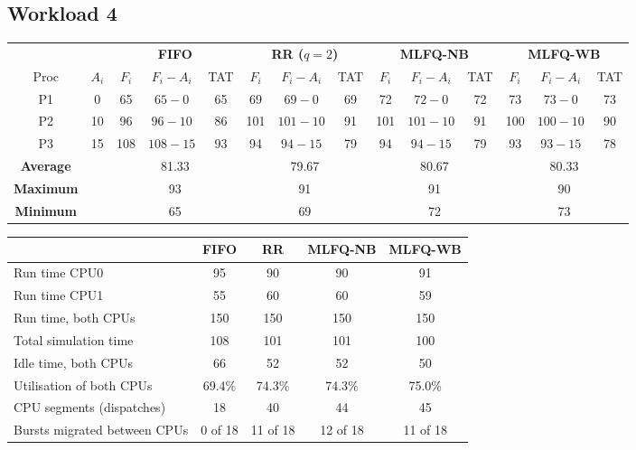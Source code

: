 \documentclass[11pt,a4paper]{article}
\begin{document}
\subsection{Workload 4}
\begin{center}\footnotesize\setlength{\tabcolsep}{4pt}
\begin{tabular}{cccccccccccccc}\toprule
& & \multicolumn{3}{c}{\textbf{FIFO}} & \multicolumn{3}{c}{\textbf{RR ($q=2$)}} & \multicolumn{3}{c}{\textbf{MLFQ-NB}} & \multicolumn{3}{c}{\textbf{MLFQ-WB}} \\
\cmidrule(lr){3-5}\cmidrule(lr){6-8}\cmidrule(lr){9-11}\cmidrule(lr){12-14}
Proc & $A_i$ & $F_i$ & $F_i-A_i$ & TAT & $F_i$ & $F_i-A_i$ & TAT & $F_i$ & $F_i-A_i$ & TAT & $F_i$ & $F_i-A_i$ & TAT \\\midrule
P1 & 0 & 65 & $65-0$ & 65 & 69 & $69-0$ & 69 & 72 & $72-0$ & 72 & 73 & $73-0$ & 73 \\
P2 & 10 & 96 & $96-10$ & 86 & 101 & $101-10$ & 91 & 101 & $101-10$ & 91 & 100 & $100-10$ & 90 \\
P3 & 15 & 108 & $108-15$ & 93 & 94 & $94-15$ & 79 & 94 & $94-15$ & 79 & 93 & $93-15$ & 78 \\
\midrule
\textbf{Average} & & \multicolumn{3}{c}{81.33} & \multicolumn{3}{c}{79.67} & \multicolumn{3}{c}{80.67} & \multicolumn{3}{c}{80.33} \\
\textbf{Maximum} & & \multicolumn{3}{c}{93} & \multicolumn{3}{c}{91} & \multicolumn{3}{c}{91} & \multicolumn{3}{c}{90} \\
\textbf{Minimum} & & \multicolumn{3}{c}{65} & \multicolumn{3}{c}{69} & \multicolumn{3}{c}{72} & \multicolumn{3}{c}{73} \\
\bottomrule\end{tabular}\end{center}
\begin{center}\footnotesize\begin{tabular}{lcccc}\toprule
& \textbf{FIFO} & \textbf{RR} & \textbf{MLFQ-NB} & \textbf{MLFQ-WB}\\\midrule
Run time CPU0 & 95 & 90 & 90 & 91 \\
Run time CPU1 & 55 & 60 & 60 & 59 \\
Run time, both CPUs & 150 & 150 & 150 & 150 \\
Total simulation time & 108 & 101 & 101 & 100 \\
Idle time, both CPUs & 66 & 52 & 52 & 50 \\
Utilisation of both CPUs & 69.4\% & 74.3\% & 74.3\% & 75.0\% \\
CPU segments (dispatches) & 18 & 40 & 44 & 45 \\
Bursts migrated between CPUs & 0 of 18 & 11 of 18 & 12 of 18 & 11 of 18 \\
\bottomrule\end{tabular}\end{center}
\end{document}
